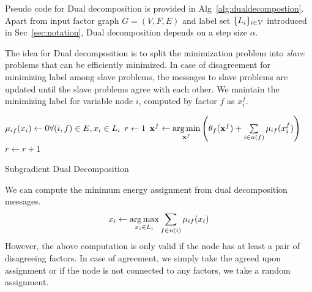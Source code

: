 \documentclass[letterpaper, 10 pt, conference]{ieeeconf} %
\DeclareMathOperator*{\argmin}{arg\,min}
\DeclareMathOperator*{\argmax}{arg\,max}
\newcommand{\vect}[1]{\mathbf{#1}}
\begin{document}
Pseudo code for Dual decomposition is provided in Alg~\ref{alg:dualdecompostion}. Apart from input factor graph $G = (V, F, E)$ and label set $\{L_i\}_{i \in V}$ introduced in Sec~\ref{sec:notation}, Dual decomposition depends on a step size $\alpha$.

The idea for Dual decomposition is to split the minimization problem into \emph{slave} problems that can be efficiently minimized. In case of disagreement for minimizing label among slave problems, the messages to slave problems are updated until the slave problems agree with each other. We maintain the minimizing label for variable node $i$, computed by factor $f$ as $x^f_i$.
\begin{algorithm}
  \dontprintsemicolon

  $\msg{i}{f}{x_i} \assign 0 \hfill \forall (i, f) \in E, x_i \in \Sx$\;
  $r \leftarrow 1$\;
   {
     {
      $\vect{x}^f \assign \argmin\limits_{\vect{x}^f} \left( \theta_f(\vect{x}^f) + \sum\limits_{i \in n(f)}\msg{i}{f}{x^f_i} \right)$\;
    }
     {
    }
    $r \leftarrow r + 1$\;
  }
  \label{alg:dualdecompostion}
  \caption{Subgradient Dual Decomposition}
\end{algorithm}
We can compute the minimum energy assignment from dual decomposition messages.
\begin{align}
  x_i \assign \argmax\limits_{x_i \in \Sx} \sum\limits_{f \in n(i)} \msg{i}{f}{x_i}
\end{align}
However, the above computation is only valid if the node has at least a pair of disagreeing factors. In case of agreement, we simply take the agreed upon assignment or if the node is not connected to any factors, we take a random assignment.
\end{document}
